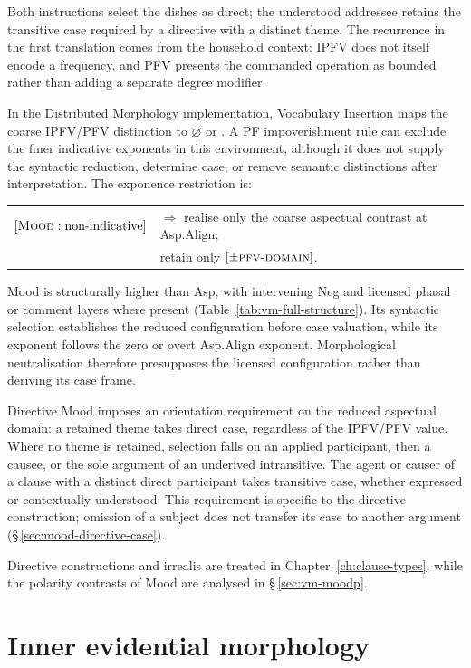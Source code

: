 Both instructions select the dishes as direct; the understood addressee
retains the transitive case required by a directive with a distinct theme.
The recurrence in the first translation comes from the household context:
IPFV does not itself encode a frequency, and PFV presents the commanded
operation as bounded rather than adding a separate degree modifier.

In the Distributed Morphology implementation, Vocabulary Insertion maps the
coarse IPFV/PFV distinction to $\varnothing$ or . A PF
impoverishment rule can exclude the finer indicative exponents in this
environment, although it does not supply the syntactic reduction, determine
case, or remove semantic distinctions after interpretation. The
exponence restriction is:

\medskip
\noindent\begin{tabular}{@{}l@{\quad}l}
$[\textsc{Mood}: \text{non-indicative}]$ & $\Rightarrow$ realise only the coarse
aspectual contrast at Asp.Align; \\
& \hspace*{1.5em}retain only $[\pm\textsc{pfv-domain}]$.
\end{tabular}
\medskip

Mood is structurally higher than Asp, with intervening Neg and licensed
phasal or comment layers where present
(Table~\ref{tab:vm-full-structure}). Its syntactic selection establishes the
reduced configuration before case valuation, while its exponent follows the
zero or overt Asp.Align exponent. Morphological neutralisation therefore
presupposes the licensed configuration rather than deriving its case frame.

Directive Mood imposes an orientation requirement on the reduced aspectual
domain: a retained theme takes direct case, regardless of the IPFV/PFV value.
Where no theme is retained, selection falls on an applied participant, then a
causee, or the sole argument of an underived intransitive. The agent or causer
of a clause with a distinct direct participant takes transitive case, whether
expressed or contextually understood. This requirement is specific to the
directive construction; omission of a subject does not transfer its case to
another argument (§\,\ref{sec:mood-directive-case}).


\noindent Directive constructions and irrealis are treated in
Chapter~\ref{ch:clause-types}, while the polarity contrasts of Mood are
analysed in §\,\ref{sec:vm-moodp}.

\section{Inner evidential morphology}\label{sec:vm-ip}
\label{sec:vm-evid}


